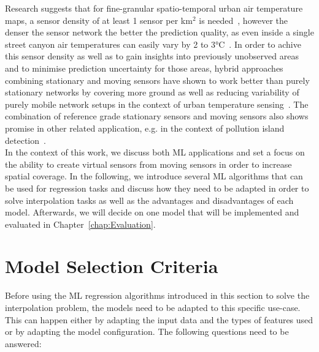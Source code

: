 Research suggests that for fine-granular spatio-temporal urban air temperature maps, a sensor density of at least 1 sensor per km$^{2}$ is needed~\cite{venter2020hyperlocal}, however the denser the sensor network the better the prediction quality, as even inside a single street canyon air temperatures can easily vary by 2 to 3°C~\cite{sugawara2008temperature}.
In order to achive this sensor density as well as to gain insights into previously unobserved areas and to minimise prediction uncertainty for those areas, hybrid approaches combining stationary and moving sensors have shown to work better than purely stationary networks by covering more ground as well as reducing variability of purely mobile network setups in the context of urban temperature sensing~\cite{yang2019designing}. The combination of reference grade stationary sensors and moving sensors also shows promise in other related application, e.g. in the context of pollution island detection~\cite{iyer2022modeling}.\\
In the context of this work, we discuss both ML applications and set a focus on the ability to create virtual sensors from moving sensors in order to increase spatial coverage.
In the following, we introduce several ML algorithms that can be used for regression tasks and discuss how they need to be adapted in order to solve interpolation tasks as well as the advantages and disadvantages of each model. Afterwards, we will decide on one model that will be implemented and evaluated in Chapter~\ref{chap:Evaluation}.

\section{Model Selection Criteria}
\label{sec: model selection criteria}

Before using the ML regression algorithms introduced in this section to solve the interpolation problem, the models need to be adapted to this specific use-case. This can happen either by adapting the input data and the types of features used or by adapting the model configuration. The following questions need to be answered:

